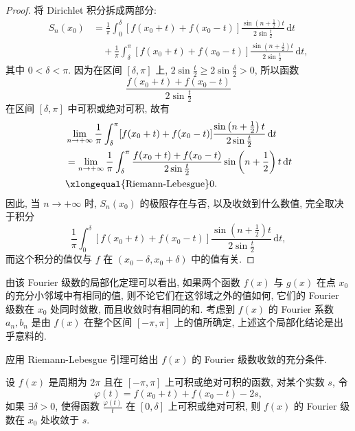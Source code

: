 \begin{proof}
将 Dirichlet 积分拆成两部分:
\[
  \begin{aligned}
    S_{n}(x_{0})&=\frac{1}{\pi}\int_{0}^{\delta}[f(x_{0}+t)+f(x_{0}-t)]\frac{\sin\left(n+\frac{1}{2}\right)t}{2\sin\frac{t}{2}}\,\mathrm{d}t\\
    &\quad+\frac{1}{\pi}\int_{\delta}^{\pi}[f(x_{0}+t)+f(x_{0}-t)]\frac{\sin\left(n+\frac{1}{2}\right)t}{2\sin\frac{t}{2}}\,\mathrm{d}t,
  \end{aligned}
\]
其中 $0<\delta<\pi$. 因为在区间 $[\delta,\pi]$ 上, $2\sin\frac{t}{2}\geqslant 2\sin\frac{\delta}{2}>0$, 所以函数
\[
  \frac{f(x_{0}+t)+f(x_{0}-t)}{2\sin\frac{t}{2}}
\]
在区间 $[\delta,\pi]$ 中可积或绝对可积, 故有
\[
  \begin{aligned}
    &\lim_{n\to+\infty}\frac{1}{\pi}\int_{\delta}^{\pi}[f(x_{0}+t)+f(x_{0}-t)]\frac{\sin\left(n+\frac{1}{2}\right)t}{2\sin\frac{t}{2}}\,\mathrm{d}t\\
    &=\lim_{n\to+\infty}\frac{1}{\pi}\int_{\delta}^{\pi}\frac{f(x_{0}+t)+f(x_{0}-t)}{2\sin\frac{t}{2}}\sin\left(n+\frac{1}{2}\right)t\,\mathrm{d}t\\
    &\xlongequal{\text{Riemann-Lebesgue}} 0.
  \end{aligned}
\]
因此, 当 $n\to+\infty$ 时, $S_{n}(x_{0})$ 的极限存在与否, 以及收敛到什么数值, 完全取决于积分
\[
  \frac{1}{\pi}\int_{0}^{\delta}[f(x_{0}+t)+f(x_{0}-t)]\frac{\sin\left(n+\frac{1}{2}\right)t}{2\sin\frac{t}{2}}\,\mathrm{d}t,
\]
而这个积分的值仅与 $f$ 在 $(x_{0}-\delta, x_{0}+\delta)$ 中的值有关.
\end{proof}

由该 Fourier 级数的局部化定理可以看出, 如果两个函数 $f(x)$ 与 $g(x)$ 在点 $x_{0}$ 的充分小邻域中有相同的值, 则不论它们在这邻域之外的值如何, 它们的 Fourier 级数在 $x_{0}$ 处同时敛散, 而且收敛时有相同的和. 考虑到 $f(x)$ 的 Fourier 系数 $a_{n}, b_{n}$ 是由 $f(x)$ 在整个区间 $[-\pi,\pi]$ 上的值所确定, 上述这个局部化结论是出乎意料的.

应用 Riemann-Lebesgue 引理可给出 $f(x)$ 的 Fourier 级数收敛的充分条件.

\begin{theorem}\label{thm:16.1.7}
设 $f(x)$ 是周期为 $2\pi$ 且在 $[-\pi,\pi]$ 上可积或绝对可积的函数, 对某个实数 $s$, 令
\[
  \varphi(t)=f(x_{0}+t)+f(x_{0}-t)-2s,
\]
如果 $\exists\delta>0$, 使得函数 $\displaystyle\frac{\varphi(t)}{t}$ 在 $[0,\delta]$ 上可积或绝对可积, 则 $f(x)$ 的 Fourier 级数在 $x_{0}$ 处收敛于 $s$.
\end{theorem}

